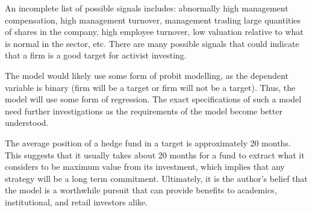 \documentclass[11pt,a4paper]{article}
\begin{document}
An incomplete list of possible signals includes: abnormally high management
compensation, high management turnover, management trading large
quantities of shares in the company, high employee turnover, low valuation 
relative to what is normal in the sector, etc. There are many possible signals 
that could indicate that a firm is a good target for activist investing. 

The model would likely use some form of probit modelling, as the dependent 
variable is binary (firm will be a target or firm will not be a target). Thus,
the model will use some form of regression. The exact specifications of such a 
model need further investigations as the requirements of the model become 
better understood. 

The average position of a hedge fund in a target is 
approximately 20 months\cite{BravEtAll}. This suggests that it usually takes 
about 20 months for a fund to extract what it considers to be maximum value 
from its investment, which implies that any strategy will be a long term 
commitment. Ultimately, it is the author's belief that the model is a 
worthwhile pursuit that can provide benefits to academics, institutional, and 
retail investors alike.




\end{document}
